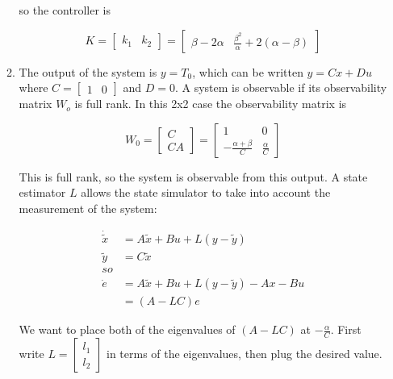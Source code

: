 \documentclass[11pt]{article}
\theoremstyle{definition}
\begin{document}
\begin{enumerate}
\begin{enumerate}
        so the controller is

        $$K = \begin{bmatrix} k_1 & k_2 \end{bmatrix} = \begin{bmatrix} \beta - 2\alpha & \frac{\beta^2}{\alpha} + 2(\alpha - \beta) \end{bmatrix} $$

        \item %
        The output of the system is $y = T_0$, which can be written $y = Cx + Du$ where $C = \begin{bmatrix} 1 & 0 \end{bmatrix}$ and $D = 0$.  A system is observable if its observability matrix $W_o$ is full rank.  In this 2x2 case the observability matrix is 

        $$ W_0 = \begin{bmatrix} C \\ CA \end{bmatrix} = \begin{bmatrix} 1 & 0 \\ -\frac{\alpha + \beta}{C} & \frac{\alpha}{C} \end{bmatrix}$$

        This is full rank, so the system is observable from this output.  A state estimator $L$ allows the state simulator to take into account the measurement of the system:

        \begin{align*}
            \dot{\tilde{x}} &= A \tilde{x} + B u + L (y - \tilde{y}) \\
            \tilde{y} &= C \tilde{x} \\
            so \\
            \dot{e} &=  A \tilde{x} + B u + L (y - \tilde{y}) - Ax - Bu\\ 
            &= (A - LC)e
        \end{align*}

        We want to place both of the eigenvalues of $(A - LC)$ at $-\frac{\alpha}{C}$.  First write $L = \begin{bmatrix} l_1 \\ l_2 \end{bmatrix}$ in terms of the eigenvalues, then plug the desired value.


\end{enumerate}
\end{enumerate}
\end{document}
